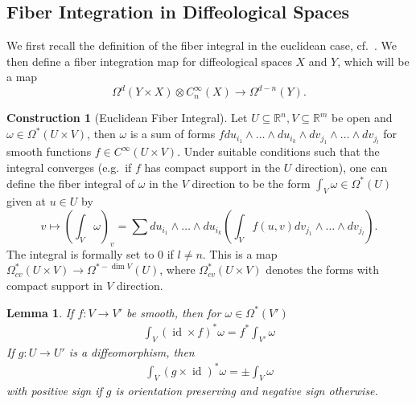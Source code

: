 \documentclass{scrartcl}
\theoremstyle{plain}
\newtheorem{lemma}[theorem]{Lemma}
\theoremstyle{definition}
\newtheorem{construction}[theorem]{Construction}
\newcommand{\R}{\mathbb R}
\renewcommand{\subset}{\subseteq}
\DeclareMathOperator{\id}{id}
\begin{document}
\subsection{Fiber Integration in Diffeological Spaces}\label{subsec:fiber-integration}
We first recall the definition of the fiber integral in the euclidean case, cf.\ \cite{bott1982differential}. We then define a fiber integration map for diffeological spaces $X$ and $Y$, which will be a map
$$\Omega^d(Y\times X) \otimes C_n^\infty(X)\to\Omega^{d-n}(Y).$$

\begin{construction} [Euclidean Fiber Integral]
    Let $U\subset \R^n, V\subset\R^m$ be open and $\omega\in\Omega^*(U\times V)$, then $\omega$ is a sum of forms $f du_{i_1}\wedge\dots \wedge du_{i_k}\wedge dv_{j_1}\wedge\dots\wedge dv_{j_l}$ for smooth functions $f\in C^\infty(U\times V)$. Under suitable conditions such that the integral converges (e.g.\ if $f$ has compact support in the $U$ direction), one can define the fiber integral of $\omega$ in the $V$ direction to be the form $\int_V \omega\in\Omega^*(U)$ given at $u\in U$ by
    $$v\mapsto \left(\int_V \omega\right)_v = \sum du_{i_1}\wedge\dots \wedge du_{i_k} \left(\int_V f(u, v) dv_{j_1}\wedge\dots\wedge dv_{j_l}\right).$$
    The integral is formally set to $0$ if $l\neq n$. This is a map $\Omega^*_{cv}(U\times V)\to \Omega^{*-\dim V}(U)$, where $\Omega^*_{cv}(U\times V)$ denotes the forms with compact support in $V$ direction. 
\end{construction}
\begin{lemma}\label{lem:fiber-int-euclidean}
    If $f\colon V\to V'$ be smooth, then for $\omega\in \Omega^*(V')$
    \begin{align*}
        \int_V (\id\times f)^*\omega = f^*\int_{V'}\omega
    \end{align*}
    If $g\colon  U\to U'$ is a diffeomorphism, then
    \begin{align*}
        \int_V (g\times\id)^*\omega = \pm \int_{V} \omega
    \end{align*}
    with positive sign if $g$ is orientation preserving and negative sign otherwise.
\end{lemma}

\end{document}
